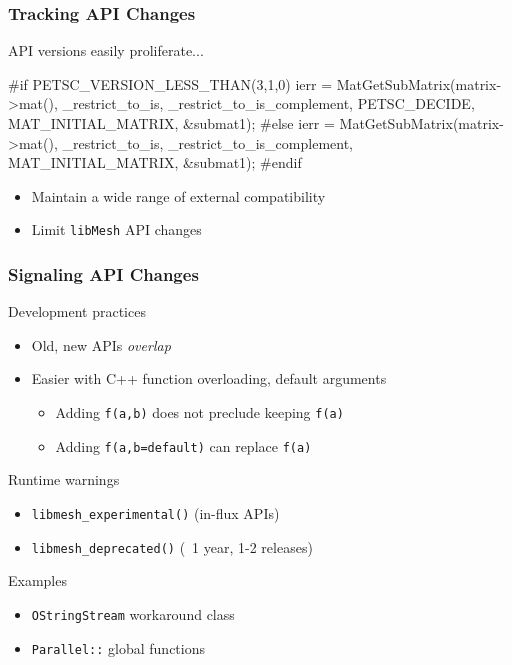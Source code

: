 \documentclass[mathserif]{beamer}
\newcommand{\libmesh}{\texttt{libMesh}\xspace}
\begin{document}
\begin{frame}[fragile]
\frametitle{Tracking API Changes}

\begin{block}{API versions easily proliferate...}
\small
\begin{semiverbatim}
#if PETSC_VERSION_LESS_THAN(3,1,0)
  ierr = MatGetSubMatrix(matrix->mat(),
           _restrict_to_is, _restrict_to_is_complement,
           \alert{PETSC_DECIDE}, MAT_INITIAL_MATRIX, &submat1);
#else
  ierr = MatGetSubMatrix(matrix->mat(),
           _restrict_to_is, _restrict_to_is_complement,
           MAT_INITIAL_MATRIX, &submat1);
#endif
\end{semiverbatim}
\end{block}

\begin{itemize}
	\item Maintain a wide range of external compatibility
	\item Limit \libmesh{} API changes
\end{itemize}

\end{frame}

\begin{frame}
\frametitle{Signaling API Changes}
\begin{block}{Development practices}
\begin{itemize}
	\item Old, new APIs {\emph{overlap}}
	\item Easier with C++ function overloading, default arguments
	\begin{itemize}
		\item Adding \texttt{f(a,b)} does not preclude keeping
			\texttt{f(a)}
		\item Adding \texttt{f(a,b=default)} can replace
			\texttt{f(a)}
	\end{itemize}
\end{itemize}
\end{block}

\begin{block}{Runtime warnings}
\begin{itemize}
	\item {\texttt{libmesh\_experimental()}} \quad (in-flux APIs)
	\item {\texttt{libmesh\_deprecated()}} \quad (~1 year, 1-2 releases)
\end{itemize}
\end{block}

\begin{block}{Examples}
\begin{itemize}
	\item {\texttt{OStringStream} workaround class}
	\item {\texttt{Parallel::} global functions}
\end{itemize}
\end{block}


\end{frame}
\end{document}
